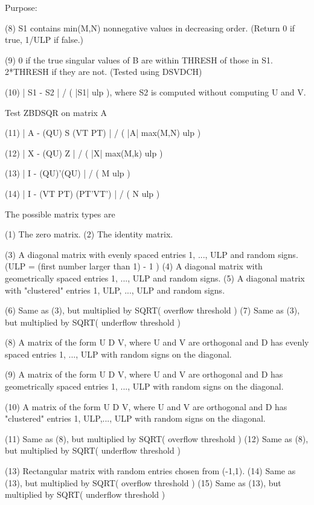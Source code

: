 \begin{DoxyParagraph}{Purpose\+: }
\begin{DoxyVerb}
 (8)   S1 contains min(M,N) nonnegative values in decreasing order.
       (Return 0 if true, 1/ULP if false.)

 (9)   0 if the true singular values of B are within THRESH of
       those in S1.  2*THRESH if they are not.  (Tested using
       DSVDCH)

 (10)  | S1 - S2 | / ( |S1| ulp ), where S2 is computed without
                                   computing U and V.

 Test ZBDSQR on matrix A

 (11)  | A - (QU) S (VT PT) | / ( |A| max(M,N) ulp )

 (12)  | X - (QU) Z | / ( |X| max(M,k) ulp )

 (13)  | I - (QU)'(QU) | / ( M ulp )

 (14)  | I - (VT PT) (PT'VT') | / ( N ulp )

 The possible matrix types are

 (1)  The zero matrix.
 (2)  The identity matrix.

 (3)  A diagonal matrix with evenly spaced entries
      1, ..., ULP  and random signs.
      (ULP = (first number larger than 1) - 1 )
 (4)  A diagonal matrix with geometrically spaced entries
      1, ..., ULP  and random signs.
 (5)  A diagonal matrix with "clustered" entries 1, ULP, ..., ULP
      and random signs.

 (6)  Same as (3), but multiplied by SQRT( overflow threshold )
 (7)  Same as (3), but multiplied by SQRT( underflow threshold )

 (8)  A matrix of the form  U D V, where U and V are orthogonal and
      D has evenly spaced entries 1, ..., ULP with random signs
      on the diagonal.

 (9)  A matrix of the form  U D V, where U and V are orthogonal and
      D has geometrically spaced entries 1, ..., ULP with random
      signs on the diagonal.

 (10) A matrix of the form  U D V, where U and V are orthogonal and
      D has "clustered" entries 1, ULP,..., ULP with random
      signs on the diagonal.

 (11) Same as (8), but multiplied by SQRT( overflow threshold )
 (12) Same as (8), but multiplied by SQRT( underflow threshold )

 (13) Rectangular matrix with random entries chosen from (-1,1).
 (14) Same as (13), but multiplied by SQRT( overflow threshold )
 (15) Same as (13), but multiplied by SQRT( underflow threshold )


\end{DoxyVerb}
\end{DoxyParagraph}
